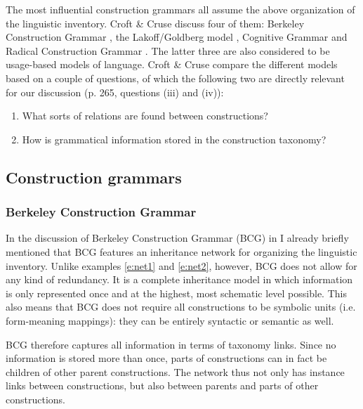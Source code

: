 \newpage
The most influential construction grammars all assume the above organization of the linguistic inventory. Croft \& Cruse discuss four of them: Berkeley Construction Grammar \citep{kay99grammatical}, the Lakoff/Goldberg model \citep{goldberg95construction}, Cognitive Grammar \citep{langacker87foundations} and Radical Construction Grammar \citep{croft01radical}. The latter three are also considered to be usage-based models of language. Croft \& Cruse compare the different models based on a couple of questions, of which the following two are directly relevant for our discussion (p. 265, questions (iii) and (iv)):

\begin{enumerate}
\item What sorts of relations are found between constructions?
\item How is grammatical information stored in the construction taxonomy?
\end{enumerate}

\subsection{Construction grammars} 
\subsubsection{Berkeley Construction Grammar}
In the discussion of Berkeley Construction Grammar (BCG) in  I already briefly mentioned that BCG features an inheritance network for organizing the linguistic inventory. Unlike examples \ref{e:net1} and \ref{e:net2}, however, BCG does not allow for any kind of  redundancy. It is a complete inheritance model in which information is only represented once and at the highest, most schematic level possible. This also means that BCG does not require all constructions to be symbolic units (i.e. form-meaning mappings): they can be entirely syntactic or semantic as well.

BCG therefore captures all information in terms of taxonomy links. Since no information is stored more than once, parts of constructions can in fact be children of other parent constructions. The network thus not only has instance links between constructions, but also between parents and parts of other constructions.



